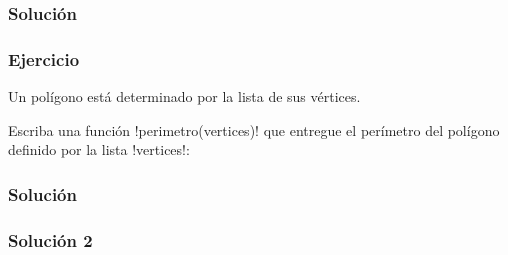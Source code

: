 \documentclass[12pt]{beamer}
\begin{document}
  \begin{frame}
    \label{solucion-ejercicio-distancia}
    \frametitle{Solución}
    
  \end{frame}

  \begin{frame}
    \label{ejercicio-perimetro}
    \frametitle{Ejercicio}
    Un polígono está determinado por la lista de sus vértices.

    Escriba una función \li!perimetro(vertices)!
    que entregue el perímetro del polígono
    definido por la lista \li!vertices!:
    
  \end{frame}

  \begin{frame}
    \label{solucion-ejercicio-perimetro}
    \frametitle{Solución}
    
  \end{frame}

  \begin{frame}
    \label{solucion-ejercicio-perimetro-2}
    \frametitle{Solución 2}
    
  \end{frame}
\end{document}
